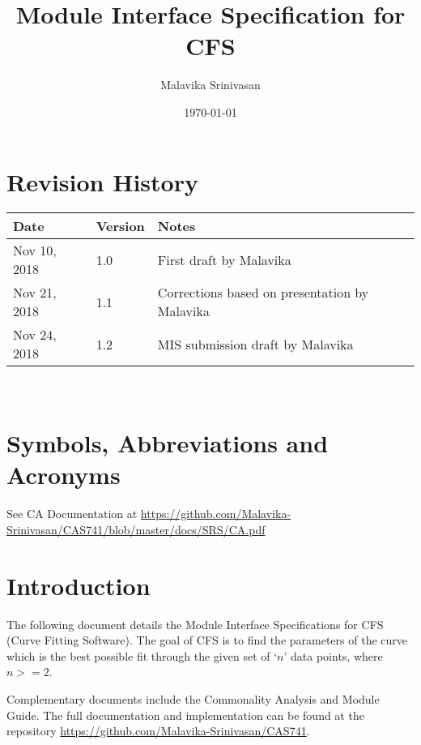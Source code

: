\documentclass[12pt, titlepage]{article}
\newcommand{\progname}{CFS}
\begin{document}
\title{Module Interface Specification for \progname}

\author{Malavika Srinivasan}

\date{\today}

\maketitle


\section{Revision History}

\begin{tabularx}{\textwidth}{p{3cm}p{2cm}X}
\toprule {\bf Date} & {\bf Version} & {\bf Notes}\\
\midrule
Nov 10, 2018 & 1.0 & First draft by Malavika\\
Nov 21, 2018 & 1.1 & Corrections based on presentation by Malavika\\
Nov 24, 2018 & 1.2 & MIS submission draft by Malavika\\
\bottomrule
\end{tabularx}

~\newpage

\section{Symbols, Abbreviations and Acronyms}

See CA Documentation at 
\url{https://github.com/Malavika-Srinivasan/CAS741/blob/master/docs/SRS/CA.pdf}


\newpage

\tableofcontents

\newpage


\section{Introduction}

The following document details the Module Interface Specifications for 
\progname{} (Curve Fitting Software). The goal of \progname{} is to find the 
parameters of the curve which is the best possible fit through the given set of 
`$n$' data points, where $n >= 2$.

Complementary documents include the Commonality Analysis and Module Guide. The 
full documentation and implementation can be found at the repository 
\url{https://github.com/Malavika-Srinivasan/CAS741}.
\end{document}
